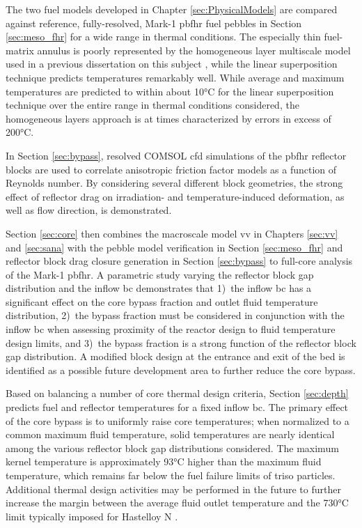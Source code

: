 The two fuel models developed in Chapter \ref{sec:PhysicalModels} are compared against reference, fully-resolved, Mark-1 \gls{pbfhr} fuel pebbles in Section \ref{sec:meso_fhr} for a wide range in thermal conditions. The especially thin fuel-matrix annulus is poorly represented by the homogeneous layer multiscale model used in a previous dissertation on this subject \cite{xin_wang_thesis}, while the linear superposition technique predicts temperatures remarkably well. While average and maximum temperatures are predicted to within about 10\si{\celsius} for the linear superposition technique over the entire range in thermal conditions considered, the homogeneous layers approach is at times characterized by errors in excess of 200\si{\celsius}.

In Section \ref{sec:bypass}, resolved COMSOL \gls{cfd} simulations of the \gls{pbfhr} reflector blocks are used to correlate anisotropic friction factor models as a function of Reynolds number. By considering several different block geometries, the strong effect of reflector drag on irradiation- and temperature-induced deformation, as well as flow direction, is demonstrated.

Section \ref{sec:core} then combines the macroscale model \gls{vv} in Chapters \ref{sec:vv} and \ref{sec:sana} with the pebble model verification in Section \ref{sec:meso_fhr} and reflector block drag closure generation in Section \ref{sec:bypass} to full-core analysis of the Mark-1 \gls{pbfhr}. A parametric study varying the reflector block gap distribution and the inflow \gls{bc} demonstrates that 1)~the inflow \gls{bc} has a significant effect on the core bypass fraction and outlet fluid temperature distribution, 2)~the bypass fraction must be considered in conjunction with the inflow \gls{bc} when assessing proximity of the reactor design to fluid temperature design limits, and 3)~the bypass fraction is a strong function of the reflector block gap distribution. A modified block design at the entrance and exit of the bed is identified as a possible future development area to further reduce the core bypass.

Based on balancing a number of core thermal design criteria, Section \ref{sec:depth} predicts fuel and reflector temperatures for a fixed inflow \gls{bc}. The primary effect of the core bypass is to uniformly raise core temperatures; when normalized to a common maximum fluid temperature, solid temperatures are nearly identical among the various reflector block gap distributions considered. The maximum kernel temperature is approximately 93\si{\celsius} higher than the maximum fluid temperature, which remains far below the fuel failure limits of \gls{triso} particles. Additional thermal design activities may be performed in the future to further increase the margin between the average fluid outlet temperature and the 730\si{\celsius} limit typically imposed for Hastelloy N \cite{xiao}.

